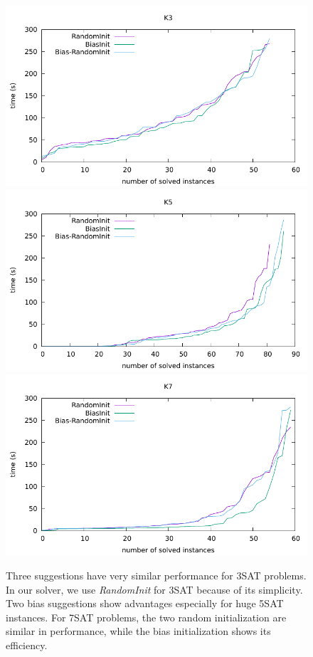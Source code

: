 \documentclass[12pt,a4paper,twoside]{scrartcl}
\numberwithin{equation}{section}
\begin{document}
\begin{figure}[H]
 \label{Experiment cactus}
  \includegraphics[scale =0.8]{DATA/K3/e1.pdf}
  \includegraphics[scale = 0.8]{DATA/K5/e1.pdf}
  \includegraphics[scale = 0.8]{DATA/K7/e1.pdf}
  \label{Experiment 1 k357 cactus plot}
  \caption{Three suggestions have very similar performance for 3SAT problems. In our solver, we use \emph{RandomInit} for 3SAT because of its simplicity. Two bias suggestions show advantages especially for huge 5SAT instances. For 7SAT problems, the two random initialization are similar in performance, while the bias initialization shows its efficiency.}
\end{figure}
\clearpage
\end{document}
